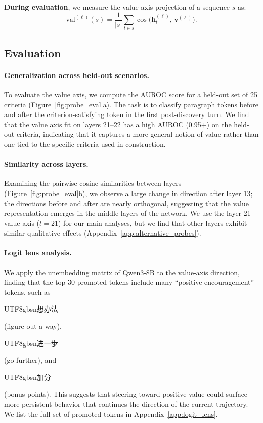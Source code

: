 \documentclass{article}
\begin{document}
\textbf{During evaluation}, we measure the value-axis projection of a sequence $s$ as:
\begin{equation}
\text{val}^{(\ell)}(s) = \frac{1}{|s|} \sum_{t \in s} \cos\bigl(\mathbf{h}^{(\ell)}_t,\, \mathbf{v}^{(\ell)}\bigr).
\label{eq:projection}
\end{equation}

\subsection{Evaluation}
\label{sec:evaluation_sub}

\paragraph{Generalization across held-out scenarios.}
To evaluate the value axis, we compute the AUROC score for a held-out set of 25 criteria (Figure~\ref{fig:probe_eval}a). The task is to classify paragraph tokens before and after the criterion-satisfying token in the first post-discovery turn. We find that the value axis fit on layers 21--22 has a high AUROC (0.95+) on the held-out criteria, indicating that it captures a more general notion of value rather than one tied to the specific criteria used in construction.

\paragraph{Similarity across layers.}
Examining the pairwise cosine similarities between layers (Figure~\ref{fig:probe_eval}b), we observe a large change in direction after layer 13; the directions before and after are nearly orthogonal, suggesting that the value representation emerges in the middle layers of the network. We use the layer-21 value axis ($l = 21$) for our main analyses, but we find that other layers exhibit similar qualitative effects (Appendix~\ref{app:alternative_probes}).

\paragraph{Logit lens analysis.}
We apply the unembedding matrix of Qwen3-8B to the value-axis direction, finding that the top 30 promoted tokens include many ``positive encouragement'' tokens, such as \begin{CJK}{UTF8}{gbsn}想办法\end{CJK} (figure out a way), \begin{CJK}{UTF8}{gbsn}进一步\end{CJK} (go further), and \begin{CJK}{UTF8}{gbsn}加分\end{CJK} (bonus points). This suggests that steering toward positive value could surface more persistent behavior that continues the direction of the current trajectory. We list the full set of promoted tokens in Appendix~\ref{app:logit_lens}.
\end{document}
